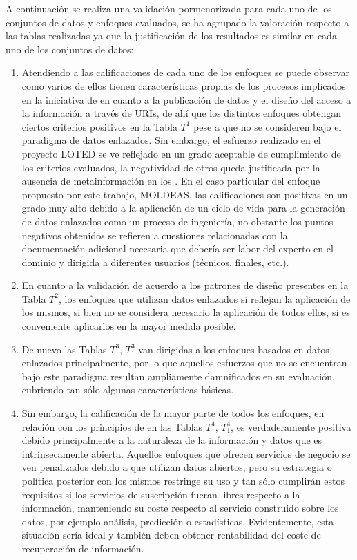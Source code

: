 A continuación se realiza una validación pormenorizada para cada uno de los conjuntos de datos y enfoques 
evaluados, se ha agrupado la valoración respecto a las tablas realizadas ya que la justificación de los resultados 
es similar en cada uno de los conjuntos de datos:

\begin{enumerate}
 \item Atendiendo a las calificaciones de cada uno de los enfoques se puede observar 
como varios de ellos tienen características propias de los procesos implicados en la iniciativa de 
\linkeddata en cuanto a la publicación de datos y el diseño del acceso a la información a través de \gls{URI}s, de ahí 
que los distintos enfoques obtengan ciertos criterios positivos en la Tabla $T^{1}$ pese a que no se consideren
bajo el paradigma de datos enlazados. Sin embargo, el esfuerzo realizado en el proyecto LOTED se ve reflejado 
en un grado aceptable de cumplimiento de los criterios evaluados, la negatividad de otros queda justificada por la 
ausencia de metainformación en los \datasets. En el caso particular del enfoque propuesto por este trabajo, \gls{MOLDEAS}, 
las calificaciones son positivas en un grado muy alto debido a la aplicación de un ciclo de vida para la generación 
de datos enlazados como un proceso de ingeniería, no obstante los puntos negativos obtenidos se refieren a cuestiones 
relacionadas con la documentación adicional necesaria que debería ser labor del experto en el dominio y dirigida 
a diferentes usuarios (técnicos, finales, etc.).

\item En cuanto a la validación de acuerdo a los patrones de diseño presentes en la Tabla $T^{2}$, los enfoques que utilizan datos enlazados sí reflejan 
la aplicación de los mismos, si bien no se considera necesario la aplicación de todos ellos, si es conveniente 
aplicarlos en la mayor medida posible. 

\item De nuevo las Tablas $T^{3}$, $T^{3}_1$ van dirigidas a los enfoques basados en datos enlazados principalmente, por lo que 
aquellos esfuerzos que no se encuentran bajo este paradigma resultan ampliamente damnificados en su evaluación, cubriendo 
tan sólo algunas características básicas. 

\item Sin embargo, la calificación de la mayor parte de todos los enfoques, en relación con los principios
de \opendata en las Tablas $T^{4}$, $T^{4}_1$, es verdaderamente positiva debido principalmente a la naturaleza de la información 
y datos que es intrínsecamente abierta. Aquellos enfoques que ofrecen servicios de negocio se ven penalizados debido a que 
utilizan datos abiertos, pero su estrategia o política posterior con los mismos restringe su uso y tan sólo cumplirán estos 
requisitos si los servicios de suscripción fueran libres respecto a la información, manteniendo su coste respecto al servicio 
construido sobre los datos, por ejemplo análisis, predicción o estadísticas. Evidentemente, esta situación sería ideal y también 
deben obtener rentabilidad del coste de recuperación de información.


\end{enumerate}
